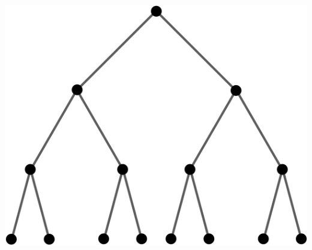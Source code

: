 \documentclass[a4paper]{article}
\begin{document}
\begin{center}
\includegraphics[scale=0.3]{Figures/rooted_binary_tree.png}
\end{center}
\end{document}
